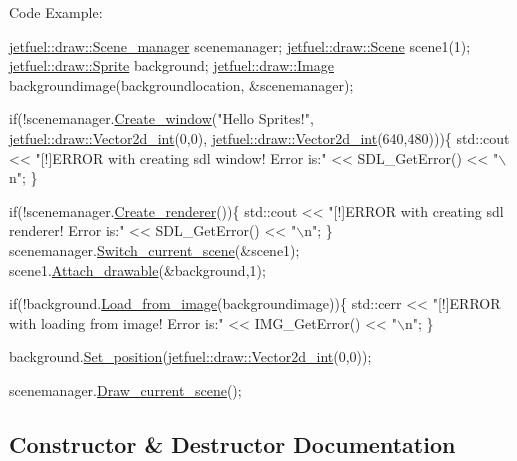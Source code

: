 Code Example\+: 
\begin{DoxyCode}
\hyperlink{classjetfuel_1_1draw_1_1Scene__manager}{jetfuel::draw::Scene\_manager} scenemanager;
\hyperlink{classjetfuel_1_1draw_1_1Scene}{jetfuel::draw::Scene} scene1(1);
\hyperlink{classjetfuel_1_1draw_1_1Sprite}{jetfuel::draw::Sprite} background;
\hyperlink{classjetfuel_1_1draw_1_1Image}{jetfuel::draw::Image} backgroundimage(backgroundlocation,
                              &scenemanager);

\textcolor{keywordflow}{if}(!scenemanager.\hyperlink{classjetfuel_1_1draw_1_1Scene__manager_a5113e9062c272a22d383ba872417ba31}{Create\_window}(\textcolor{stringliteral}{"Hello Sprites!"},
                               \hyperlink{classjetfuel_1_1draw_1_1Vector2d}{jetfuel::draw::Vector2d\_int}(0,0),
                               \hyperlink{classjetfuel_1_1draw_1_1Vector2d}{jetfuel::draw::Vector2d\_int}(640,480)))\{
    std::cout << \textcolor{stringliteral}{"[!]ERROR with creating sdl window! Error is:"} <<
    SDL\_GetError() << \textcolor{stringliteral}{"\(\backslash\)n"};
\}

\textcolor{keywordflow}{if}(!scenemanager.\hyperlink{classjetfuel_1_1draw_1_1Scene__manager_afafecd926ce5e4b2543a6d583a7d24b6}{Create\_renderer}())\{
    std::cout << \textcolor{stringliteral}{"[!]ERROR with creating sdl renderer! Error is:"} <<
    SDL\_GetError() << \textcolor{stringliteral}{"\(\backslash\)n"};
\}
scenemanager.\hyperlink{classjetfuel_1_1draw_1_1Scene__manager_a770c163b88ba8427539ee182315ea989}{Switch\_current\_scene}(&scene1);
scene1.\hyperlink{classjetfuel_1_1draw_1_1Scene_aea4b4c4ae25c30d661be4c52787e0ea3}{Attach\_drawable}(&background,1);

\textcolor{keywordflow}{if}(!background.\hyperlink{classjetfuel_1_1draw_1_1Sprite_a370d0b3b2770348ae57ae5156c59a0ca}{Load\_from\_image}(backgroundimage))\{
    std::cerr << \textcolor{stringliteral}{"[!]ERROR with loading from image! Error is:"} <<
    IMG\_GetError() << \textcolor{stringliteral}{"\(\backslash\)n"};
\}

background.\hyperlink{classjetfuel_1_1draw_1_1Drawable_afdd035afe40c706459a6c9df813bcce6}{Set\_position}(\hyperlink{classjetfuel_1_1draw_1_1Vector2d}{jetfuel::draw::Vector2d\_int}(0,0));

scenemanager.\hyperlink{classjetfuel_1_1draw_1_1Scene__manager_a8af9a3abfd5121b1b8556342de435773}{Draw\_current\_scene}();
\end{DoxyCode}
 

\subsection{Constructor \& Destructor Documentation}
\mbox{\label{classjetfuel_1_1draw_1_1Sprite_a108a6509a5d4b86e69942788d4401213}} 
